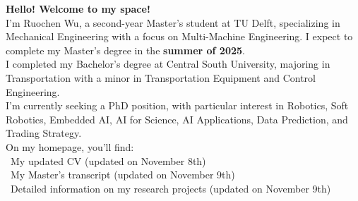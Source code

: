 \textbf{Hello! Welcome to my space!} \\

I’m Ruochen Wu, a second-year Master's student at TU Delft, specializing in Mechanical Engineering with a focus on Multi-Machine Engineering. I expect to complete my Master's degree in the \textbf{summer of 2025}. \\

I completed my Bachelor’s degree at Central South University, majoring in Transportation with a minor in Transportation Equipment and Control Engineering. \\

I’m currently seeking a PhD position, with particular interest in Robotics, Soft Robotics, Embedded AI, AI for Science, AI Applications, Data Prediction, and Trading Strategy. \\

On my homepage, you’ll find:
\\
\textbullet \, My updated CV (updated on November 8th) \\
\textbullet \, My Master’s transcript (updated on November 9th) \\
\textbullet \, Detailed information on my research projects (updated on November 9th)
